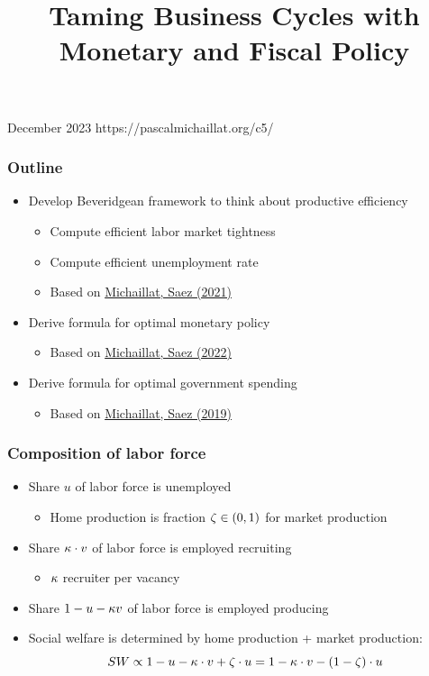 \documentclass[11pt,aspectratio=169,xcolor={dvipsnames},hyperref={pdftex,pdfpagemode=UseNone,hidelinks,pdfdisplaydoctitle=true},usepdftitle=false]{beamer}
\begin{document}
\title{Taming Business Cycles with Monetary and Fiscal Policy}
%
{December 2023}%
{https://pascalmichaillat.org/c5/}
\frame{\titlepage}

\begin{frame}
\frametitle{Outline}
\begin{itemize}
\item Develop Beveridgean framework to think about productive efficiency
\begin{itemize}
	\item Compute efficient labor market tightness
	\item Compute efficient unemployment rate
	\item Based on \href{https://pascalmichaillat.org/9/}{Michaillat, Saez (2021)}
\end{itemize}
\item Derive formula for optimal monetary policy
\begin{itemize}
\item Based on \href{https://pascalmichaillat.org/7/}{Michaillat, Saez (2022)}
\end{itemize}
\item Derive formula for optimal government spending
\begin{itemize}
\item Based on \href{https://pascalmichaillat.org/6/}{Michaillat, Saez (2019)}
 \end{itemize}
\end{itemize}
\end{frame}

\begin{frame}
\end{frame}

\begin{frame}
\frametitle{Composition of labor force}
\begin{itemize}
\item Share $u$ of labor force is unemployed
\begin{itemize}
	\item Home production is fraction $\zeta\in(0,1)$ for market production
\end{itemize}
\item Share $\kappa\cdot v$ of labor force is employed recruiting
\begin{itemize}
	\item $\kappa$ recruiter per vacancy
\end{itemize}
\item Share $1-u-\kappa v$ of labor force is employed producing
\item Social welfare is determined by home production + market production:
\begin{equation*}
SW \propto 1 - u - \kappa \cdot v + \zeta \cdot u = 1 - \kappa \cdot v - (1-\zeta) \cdot u 
\end{equation*}
\end{itemize}
\end{frame}
\end{document}
